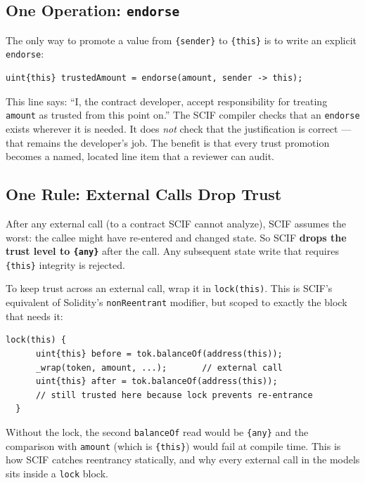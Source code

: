 \documentclass[11pt,a4paper]{article}
\begin{document}
\subsection{One Operation: \texttt{endorse}}
\label{sec:primer-endorse}

The only way to promote a value from \texttt{\{sender\}} to \texttt{\{this\}}
is to write an explicit \texttt{endorse}:

\begin{lstlisting}[style=scifstyle,numbers=none]
  uint{this} trustedAmount = endorse(amount, sender -> this);
\end{lstlisting}

This line says: ``I, the contract developer, accept responsibility for
treating \texttt{amount} as trusted from this point on.'' The SCIF compiler
checks that an \texttt{endorse} exists wherever it is needed. It does
\emph{not} check that the justification is correct --- that remains the
developer's job. The benefit is that every trust promotion becomes a named,
located line item that a reviewer can audit.

\subsection{One Rule: External Calls Drop Trust}
\label{sec:primer-pc}

After any external call (to a contract SCIF cannot analyze), SCIF assumes
the worst: the callee might have re-entered and changed state. So SCIF
\textbf{drops the trust level to \texttt{\{any\}}} after the call. Any
subsequent state write that requires \texttt{\{this\}} integrity is rejected.

To keep trust across an external call, wrap it in \texttt{lock(this)}.
This is SCIF's equivalent of Solidity's \texttt{nonReentrant} modifier,
but scoped to exactly the block that needs it:

\begin{lstlisting}[style=scifstyle,numbers=none]
  lock(this) {
      uint{this} before = tok.balanceOf(address(this));
      _wrap(token, amount, ...);       // external call
      uint{this} after = tok.balanceOf(address(this));
      // still trusted here because lock prevents re-entrance
  }
\end{lstlisting}

Without the lock, the second \texttt{balanceOf} read would be \texttt{\{any\}}
and the comparison with \texttt{amount} (which is \texttt{\{this\}}) would
fail at compile time. This is how SCIF catches reentrancy statically, and
why every external call in the models sits inside a \texttt{lock} block.
\end{document}

